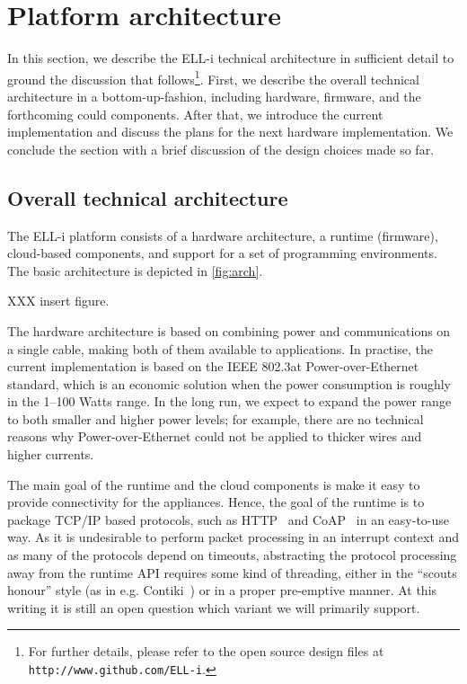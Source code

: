 \documentclass[draft,a4paper]{siamltex}
\begin{document}

\section{Platform architecture}
\label{sec:architecture}

In this section, we describe the ELL-i technical architecture in
sufficient detail to ground the discussion that follows\footnote{For further
details, please refer to the open source design files at
\hbox{\tt http://www.github.com/ELL-i}.}.
First, we describe the overall technical architecture in a
bottom-up-fashion, including hardware, firmware, and the forthcoming
could components.  After that, we introduce the current
implementation and discuss the plans for the next hardware implementation.  We
conclude the section with a brief discussion of the design choices
made so far.

\subsection{Overall technical architecture}

The ELL-i platform consists of a hardware architecture, a runtime
(firmware), cloud-based components, and support for a set of
programming environments.  The basic architecture is depicted in
\ref{fig:arch}.

XXX insert figure.

The hardware architecture is based on combining power and
communications on a single cable, making both of them available to
applications.  In practise, the current implementation is based on the
IEEE 802.3at Power-over-Ethernet standard, which is an economic
solution when the power consumption is roughly in the 1--100 Watts
range.  In the long run, we expect to expand the power range to both
smaller and higher power levels; for example, there are no technical
reasons why Power-over-Ethernet could not be applied to thicker wires
and higher currents.

The main goal of the runtime and the cloud components is make it easy
to provide connectivity for the appliances.  Hence, the goal of the
runtime is to package TCP/IP based protocols, such as HTTP~\cite{HTTP}
and CoAP~\cite{CoAP} in an easy-to-use way.  As it is undesirable to
perform packet processing in an interrupt context and as many of the
protocols depend on timeouts, abstracting the protocol processing away
from the runtime API requires some kind of threading, either in the
``scouts honour'' style (as in e.g. Contiki~\cite{Contiki-scheduler})
or in a proper pre-emptive manner.  At this writing it is still an
open question which variant we will primarily support.
\end{document}
